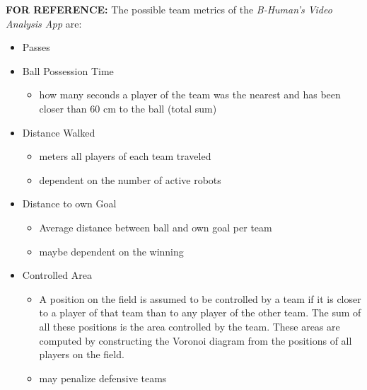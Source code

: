 \textbf{FOR REFERENCE: }The possible team metrics of the \textit{B-Human's Video Analysis App} are: 
\begin{itemize}
    \item Passes
    \item Ball Possession Time 
    \begin{itemize}
        \item how many seconds a player of the team was the nearest and has been closer than 60 cm to the ball (total sum)
    \end{itemize}
    \item Distance Walked
    \begin{itemize}
        \item meters all players of each team traveled
        \item dependent on the number of active robots
    \end{itemize}
    \item Distance to own Goal
    \begin{itemize}
        \item Average distance between ball and own goal per team
        \item maybe dependent on the winning
    \end{itemize}
    \item Controlled Area 
    \begin{itemize}
        \item A position on the field is assumed to be controlled by a team if it is closer to a player
        of that team than to any player of the other team. The sum of all these positions is the
        area controlled by the team. These areas are computed by constructing the Voronoi diagram
        from the positions of all players on the field.
        \item may penalize defensive teams
    \end{itemize}
\end{itemize}

